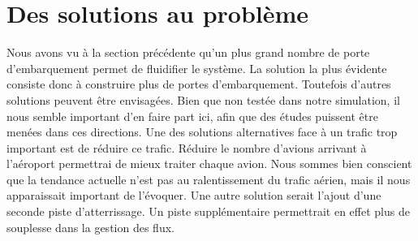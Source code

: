 \section{Des solutions au problème}
Nous avons vu à la section précédente qu'un plus grand nombre de porte d'embarquement permet de fluidifier le système. La solution la plus évidente consiste donc à construire plus de portes d'embarquement.
Toutefois d'autres solutions peuvent être envisagées. Bien que non testée dans notre simulation, il nous semble important d'en faire part ici, afin que des études puissent être menées dans ces directions.
Une des solutions alternatives face à un trafic trop important est de réduire ce trafic. Réduire le nombre d'avions arrivant à l'aéroport permettrai de mieux traiter chaque avion. Nous sommes bien conscient que la tendance actuelle n'est pas au ralentissement du trafic aérien, mais il nous apparaissait important de l'évoquer.
Une autre solution serait l'ajout d'une seconde piste d'atterrissage. Un piste supplémentaire permettrait en effet plus de souplesse dans la gestion des flux.





